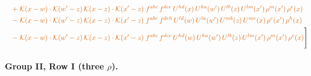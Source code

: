 \documentclass[10pt]{article}
\numberwithin{equation}{section}
\begin{document}
\begin{align}
&\quad{\color{BFK}+\;\mathcal{K}(x-w)\cdot\mathcal{K}(w'-z)\,\mathcal{K}(x-z)\cdot\mathcal{K}(x'-z)\;f^{abc}\,f^{dce}\,U^{hd}(x)\,U^{ha}(w')\,U^{lb}(z)\,U^{lm}(x')\,\rho^{m}(x')\,\rho^{e}(x)}\notag\\
&\quad{\color{BFK}-\;\mathcal{K}(x-w)\cdot\mathcal{K}(w'-z)\,\mathcal{K}(x-z)\cdot\mathcal{K}(x'-z)\;f^{abc}\,f^{deh}\,U^{ld}(w)\,U^{la}(w')\,U^{mb}(z)\,U^{me}(x)\,\rho^{c}(x')\,\rho^{h}(x)}\notag\\
&\quad{\color{BFK}-\;\mathcal{K}(x-w)\cdot\mathcal{K}(w'-z)\,\mathcal{K}(x-z)\cdot\mathcal{K}(x'-z)\;f^{abc}\,f^{dce}\,U^{hd}(w)\,U^{ha}(w')\,U^{lb}(z)\,U^{lm}(x')\,\rho^{m}(x')\,\rho^{e}(x)}\Bigg]\label{eq:P2}
\end{align}
\paragraph{Group II, Row I (three $\rho$).}
\end{document}
